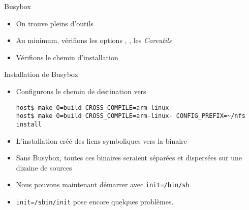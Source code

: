 \begin{frame}[fragile=singleslide]{Busybox}
  \begin{itemize}
  \item On trouve pleins d'outils
  \item    Au   minimum,    vérifions les options    ,   ,    les
    \emph{Coreutils}
  \item Vérifions le chemin d'installation
  \end{itemize}
\end{frame}

\begin{frame}[fragile=singleslide]{Installation de Busybox}
  \begin{itemize}
  \item Configurons le chemin de destination vers 
    \begin{lstlisting}
host$ make O=build CROSS_COMPILE=arm-linux-
host$ make O=build CROSS_COMPILE=arm-linux- CONFIG_PREFIX=~/nfs install
    \end{lstlisting}
  \item  L'installation créé  des  liens symboliques  vers la  binaire
  \item  Sans  Busybox,  toutes  ces  binaires  seraient  séparées  et
    dispersées sur une dizaine de sources
  \item Nous pouvons maintenant démarrer avec \verb+init=/bin/sh+
  \item \verb+init=/sbin/init+ pose encore quelques problèmes.
  \end{itemize}
\end{frame}

